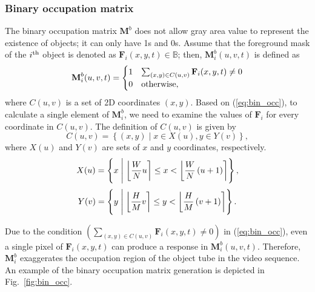 \documentclass[11pt]{hyu_thesis}
\begin{document}
\subsubsection{Binary occupation matrix}
\label{sec:proposed:occ:binary}
The binary occupation matrix $\textbf{M}^b$ does not allow gray area value to represent the existence of objects; it can only have 1s and 0s. Assume that the foreground mask of the $i^{\rm{th}}$ object is denoted as $\textbf{F}_i(x,y,t) \in \mathbb{B}$; then, $\textbf{M}_i^b(u,v,t)$ is defined as
\begin{equation}
\label{eq:bin_occ}
\textbf{M}_i^b(u,v,t)=
\begin{cases}
1 & \sum_{(x,y) \in C(u,v)}\textbf{F}_i(x,y,t) \neq 0 \\
0 & \rm{otherwise},
\end{cases}
\end{equation}
where $C(u,v)$ is a set of 2D coordinates $(x,y)$. Based on (\ref{eq:bin_occ}), to calculate a single element of $\textbf{M}_i^b$, we need to examine the values of $\textbf{F}_i$ for every coordinate in $C(u,v)$. The definition of $C(u,v)$ is given by
\begin{equation}
C(u,v)=\left\{ (x,y) \mid x \in X(u), y \in Y(v) \right\},
\end{equation}
where $X(u)$ and $Y(v)$ are sets of $x$ and $y$ coordinates, respectively.
\begin{equation}
X(u)=\left\{ x \;\middle|\; \round*{\frac{W}{N}u} \leq x < \round*{\frac{W}{N}\left( u + 1 \right)} \right\},
\end{equation}
\begin{equation}
Y(v)=\left\{ y \;\middle|\; \round*{\frac{H}{M}v} \leq y < \round*{\frac{H}{M}\left( v + 1 \right)} \right\}.
\end{equation}

Due to the condition $\left( \sum_{(x,y) \in C(u,v)}\textbf{F}_i(x,y,t) \neq 0 \right)$ in (\ref{eq:bin_occ}), even a single pixel of $\textbf{F}_i(x,y,t)$ can produce a response in $\textbf{M}_i^b(u,v,t)$. Therefore, $\textbf{M}_i^b$ exaggerates the occupation region of the object tube in the video sequence. An example of the binary occupation matrix generation is depicted in Fig.~\ref{fig:bin_occ}.
\end{document}
